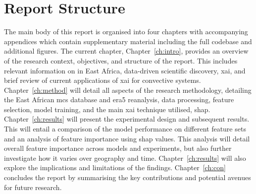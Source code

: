 \section{Report Structure}

The main body of this report is organised into four chapters with accompanying appendices which contain supplementary material including the full codebase and additional figures. The current chapter, Chapter~\ref{ch:intro}, provides an overview of the research context, objectives, and structure of the report. This includes relevant information on  in East Africa, data-driven scientific discovery, \acrfull{xai}, and brief review of current applications of \acrshort{xai} for convective systems. Chapter~\ref{ch:method} will detail all aspects of the research methodology, detailing the East African \acrshort{mcs} database and \acrshort{era5} reanalysis, data processing, feature selection, model training, and the main \acrshort{xai} technique utilised, \acrshort{shap}. Chapter~\ref{ch:results} will present the experimental design and subsequent results. This will entail a comparison of the model performance on different feature sets and an analysis of feature importance using \acrshort{shap} values. This analysis will detail overall feature importance across models and experiments, but also further investigate how it varies over geography and time. Chapter~\ref{ch:results} will also explore the implications and limitations of the findings. Chapter~\ref{ch:con} concludes the report by summarising the key contributions and potential avenues for future research.